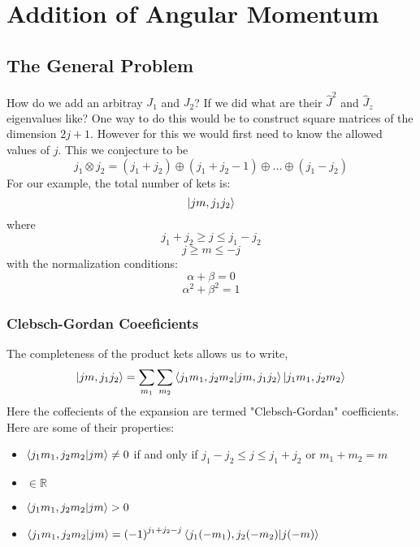 \chapter{Addition of Angular Momentum}
\section{The General Problem}
How do we add an arbitray $J_{1}$ and $J_{2}$? If we did what are their $\hat{J}^{2}$ and $\hat{J}_{z}$ eigenvalues like? One way to do this would be to construct square matrices of the dimension $2j +1$. However for this we would first need to know the allowed values of $j$. This we conjecture to be
\begin{equation}
j_{1} \otimes j_{2} = (j_{1} + j_{2}) \oplus (j_{1} + j_{2} - 1) \oplus ... \oplus (j_{1} - j_{2})
\end{equation}
For our example, the total number of kets is:
$$\ket{jm, j_{1}j_{2}}$$
where
$$j_{1} + j_{2} \geq j \leq j_{1} - j_{2}$$
$$j \geq m \leq -j$$
with the normalization conditions:
$$\alpha + \beta = 0$$
$$\alpha^{2} + \beta^{2} = 1$$
\subsection{Clebsch-Gordan Coeeficients}
The completeness of the product kets allows us to write,
\begin{equation}
\ket{jm,j_{1}j_{2}} = \sum_{m_{1}} \sum_{m_{2}} \braket{j_{1}m_{1},j_{2}m_{2}}{jm, j_{1}j_{2}} \ket{j_{1}m_{1},j_{2}m_{2}}
\end{equation}
Here the coffecients of the expansion are termed "Clebsch-Gordan" coefficients. Here are some of their properties:
\begin{itemize}
\item $\braket{j_{1}m_{1},j_{2}m_{2}}{jm}\neq 0$ if and only if $j_{1} - j_{2}\leq j \leq j_{1} + j_{2}$ or $m_{1} + m_{2} = m$
\item $\in \mathbb{R}$
\item $\braket{j_{1}m_{1},j_{2}m_{2}}{jm} > 0$
\item $\braket{j_{1}m_{1},j_{2}m_{2}}{jm} = {(-1)}^{j_{1} + j_{2} - j}\braket{j_{1}(-m_{1}),j_{2}(-m_{2})}{j(-m)}$
\end{itemize}


